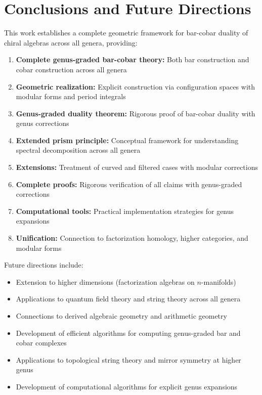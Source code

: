 \section{Conclusions and Future Directions}
 
This work establishes a complete geometric framework for bar-cobar duality of chiral algebras across all genera, providing:

\begin{enumerate}
\item \textbf{Complete genus-graded bar-cobar theory:} Both bar construction and cobar construction across all genera
\item \textbf{Geometric realization:} Explicit construction via configuration spaces with modular forms and period integrals
\item \textbf{Genus-graded duality theorem:} Rigorous proof of bar-cobar duality with genus corrections
\item \textbf{Extended prism principle:} Conceptual framework for understanding spectral decomposition across all genera
\item \textbf{Extensions:} Treatment of curved and filtered cases with modular corrections
\item \textbf{Complete proofs:} Rigorous verification of all claims with genus-graded corrections
\item \textbf{Computational tools:} Practical implementation strategies for genus expansions
\item \textbf{Unification:} Connection to factorization homology, higher categories, and modular forms
\end{enumerate}

Future directions include:
\begin{itemize}
\item Extension to higher dimensions (factorization algebras on $n$-manifolds)
\item Applications to quantum field theory and string theory across all genera
\item Connections to derived algebraic geometry and arithmetic geometry
\item Development of efficient algorithms for computing genus-graded bar and cobar complexes
\item Applications to topological string theory and mirror symmetry at higher genus
\item Development of computational algorithms for explicit genus expansions
\end{itemize}
 
